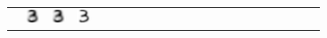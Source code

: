\documentclass[a4paper,english]{article}
\begin{document}
\begin{table}[]
\begin{tabular}{llllllllllllllllllllll}
 &  \includegraphics[height=0.4cm]{fraction_usps/three_kernelPCA_19.png}
 &  \includegraphics[height=0.4cm]{fraction_usps/three_kernelPCA_20.png}
 &  \includegraphics[height=0.4cm]{fraction_usps/three_clean.png} 
 \\
\end{tabular}
\end{table}
\end{document}
